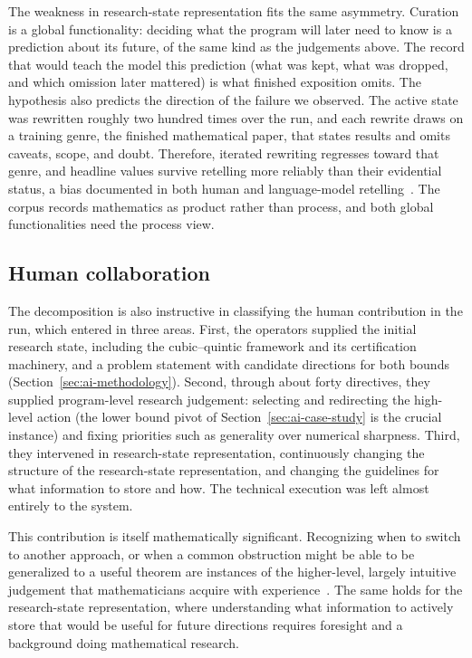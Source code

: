 The weakness in research-state representation fits the same asymmetry.
Curation is a global functionality: deciding what the program will later need to
know is a prediction about its future, of the same kind as the judgements
above. The record that would teach the model this prediction (what was kept, what was dropped,
and which omission later mattered) is what finished exposition
omits. The hypothesis also predicts the direction of the failure we
observed. The active state was rewritten roughly two hundred times over the
run, and each rewrite draws on a training genre, the finished mathematical paper, that
states results and omits caveats, scope, and doubt. Therefore, iterated rewriting regresses toward that genre, and headline values survive retelling
more reliably than their evidential status, a bias documented in both human
and language-model
retelling~\cite{bartlett1932remembering,acerbi2023transmission,mohamed2025broken}.
The corpus records mathematics as product rather than process, and both
global functionalities need the process view.


\subsection{Human collaboration}

The decomposition is also instructive in classifying the human contribution in the run, which entered in three areas. First, the operators supplied the initial
research state, including the cubic--quintic framework and its certification
machinery, and a problem statement with candidate directions for both
bounds (Section~\ref{sec:ai-methodology}). Second, through about forty directives, they supplied
program-level research judgement: selecting and redirecting the
high-level action (the lower bound pivot of Section~\ref{sec:ai-case-study} is the
crucial instance) and fixing priorities such as generality over
numerical sharpness. Third, they
intervened in research-state representation, continuously changing the structure of the research-state representation, and changing the guidelines for what information to store and how. The technical execution was left almost entirely
to the system.

This contribution is itself mathematically significant. Recognizing when to switch to another approach, or when a common obstruction might be able to be generalized to a useful theorem are instances of the higher-level, largely intuitive
judgement that mathematicians acquire with
experience~\cite{tao2007good,thurston1994proof}. The same holds for the research-state representation, where understanding what information to actively store that would be useful for future directions requires foresight and a background doing mathematical research.

